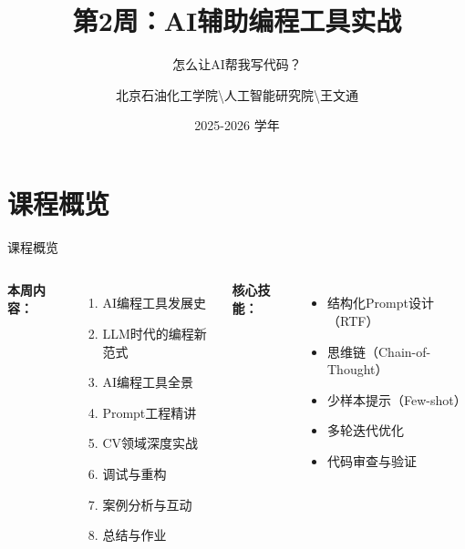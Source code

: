 \documentclass[aspectratio=169, 10pt]{beamer}
\title[AI辅助编程工具实战]{第2周：AI辅助编程工具实战}
\subtitle{怎么让AI帮我写代码？}
\author{北京石油化工学院\textbackslash 人工智能研究院\textbackslash 王文通}
\institute{通选课}
\date{2025-2026 学年}
\begin{document}
\begin{frame}
	\titlepage
\end{frame}

\section*{课程概览}
\begin{frame}{课程概览}
	\begin{columns}
		\textbf{本周内容：}
		\begin{enumerate}
			\item AI编程工具发展史
			\item LLM时代的编程新范式
			\item AI编程工具全景
			\item Prompt工程精讲
			\item CV领域深度实战
			\item 调试与重构
			\item 案例分析与互动
			\item 总结与作业
		\end{enumerate}

		\textbf{核心技能：}
		\begin{itemize}
			\item 结构化Prompt设计（RTF）
			\item 思维链（Chain-of-Thought）
			\item 少样本提示（Few-shot）
			\item 多轮迭代优化
			\item 代码审查与验证
		\end{itemize}
	\end{columns}
\end{frame}
\end{document}
